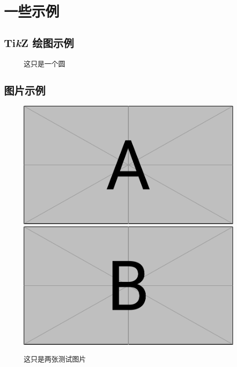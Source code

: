 \section{一些示例}

\subsection{Ti\textit{k}Z 绘图示例}

\begin{figure}[htbp!]
  \centering
  \caption{这只是一个圆}
\end{figure}

\subsection{图片示例}
\begin{figure}[htbp!]
  \centering
  \includegraphics[scale = 0.35]{../assets/figure_a.pdf}
  \quad
  \includegraphics[scale = 0.35]{../assets/figure_b.pdf}
  \caption{这只是两张测试图片}
\end{figure}

